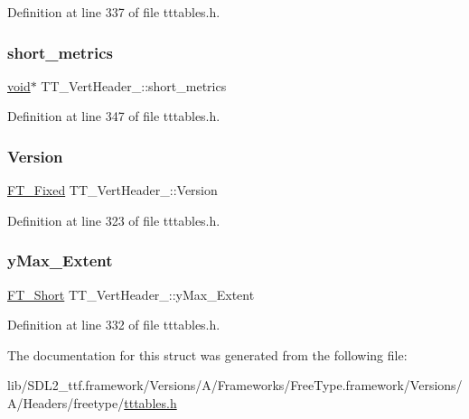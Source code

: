 Definition at line 337 of file tttables.\+h.

\mbox{\label{struct_t_t___vert_header___ad5e875c19a02b0f6777db1c122bff2f3}} 
\subsubsection{\texorpdfstring{short\_metrics}{short\_metrics}}
{\footnotesize\ttfamily \mbox{\hyperlink{_s_d_l__opengles2__gl2ext_8h_ae5d8fa23ad07c48bb609509eae494c95}{void}}$\ast$ T\+T\+\_\+\+Vert\+Header\+\_\+\+::short\+\_\+metrics}



Definition at line 347 of file tttables.\+h.

\mbox{\label{struct_t_t___vert_header___a32d736621b757e9a39a15f2f82d15b9c}} 
\subsubsection{\texorpdfstring{Version}{Version}}
{\footnotesize\ttfamily \mbox{\hyperlink{fttypes_8h_a5f5a679cc09f758efdd0d1c5feed3c3d}{F\+T\+\_\+\+Fixed}} T\+T\+\_\+\+Vert\+Header\+\_\+\+::\+Version}



Definition at line 323 of file tttables.\+h.

\mbox{\label{struct_t_t___vert_header___af6927e95c1dfbe90c2e76b1eef521d53}} 
\subsubsection{\texorpdfstring{yMax\_Extent}{yMax\_Extent}}
{\footnotesize\ttfamily \mbox{\hyperlink{fttypes_8h_aa7279be89046a2563cd3d4d6651fbdcf}{F\+T\+\_\+\+Short}} T\+T\+\_\+\+Vert\+Header\+\_\+\+::y\+Max\+\_\+\+Extent}



Definition at line 332 of file tttables.\+h.



The documentation for this struct was generated from the following file\+:\begin{DoxyCompactItemize}
\item 
lib/\+S\+D\+L2\+\_\+ttf.\+framework/\+Versions/\+A/\+Frameworks/\+Free\+Type.\+framework/\+Versions/\+A/\+Headers/freetype/\mbox{\hyperlink{tttables_8h}{tttables.\+h}}\end{DoxyCompactItemize}
